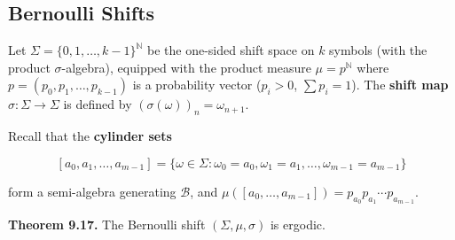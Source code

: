 \subsection{Bernoulli Shifts}\label{sec:9.7.3}

Let $\Sigma = \{0, 1, \ldots, k-1\}^{\mathbb{N}}$ be the one-sided shift space on $k$ symbols (with the product $\sigma$-algebra), equipped with the product measure $\mu = p^{\mathbb{N}}$ where $p = (p_0, p_1, \ldots, p_{k-1})$ is a probability vector ($p_i > 0$, $\sum p_i = 1$). The \textbf{shift map} $\sigma: \Sigma \to \Sigma$ is defined by $(\sigma(\omega))_n = \omega_{n+1}$.

Recall that the \textbf{cylinder sets}

\[
[a_0, a_1, \ldots, a_{m-1}] = \{\omega \in \Sigma : \omega_0 = a_0, \omega_1 = a_1, \ldots, \omega_{m-1} = a_{m-1}\}
\]

form a semi-algebra generating $\mathcal{B}$, and $\mu([a_0, \ldots, a_{m-1}]) = p_{a_0} p_{a_1} \cdots p_{a_{m-1}}$.

\textbf{Theorem 9.17.} The Bernoulli shift $(\Sigma, \mu, \sigma)$ is ergodic.

